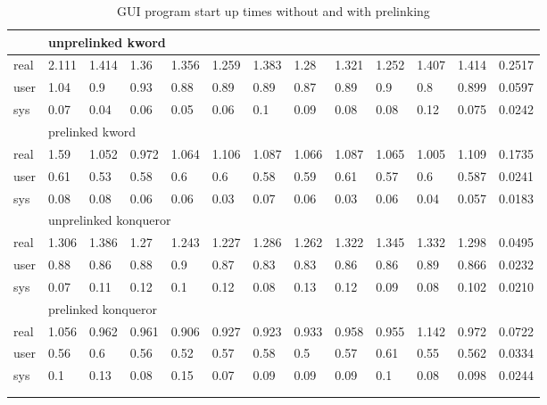 \documentclass[twoside]{article}
\begin{document}
{\begin{center}
\begin{longtable}{l|llllllllll|ll}
\hline
& \multicolumn{10}{l|}{unprelinked kword} && \\
\hline
{real} & {2.111} & {1.414} & {1.36} & {1.356} & {1.259} & {1.383} & {1.28} & {1.321} & {1.252} & {1.407} & {1.414} & {0.2517} \\
{user} & {1.04} & {0.9} & {0.93} & {0.88} & {0.89} & {0.89} & {0.87} & {0.89} & {0.9} & {0.8} & {0.899} & {0.0597} \\
{sys} & {0.07} & {0.04} & {0.06} & {0.05} & {0.06} & {0.1} & {0.09} & {0.08} & {0.08} & {0.12} & {0.075} & {0.0242} \\
\hline
& \multicolumn{10}{l|}{prelinked kword} && \\
\hline
{real} & {1.59} & {1.052} & {0.972} & {1.064} & {1.106} & {1.087} & {1.066} & {1.087} & {1.065} & {1.005} & {1.109} & {0.1735} \\
{user} & {0.61} & {0.53} & {0.58} & {0.6} & {0.6} & {0.58} & {0.59} & {0.61} & {0.57} & {0.6} & {0.587} & {0.0241} \\
{sys} & {0.08} & {0.08} & {0.06} & {0.06} & {0.03} & {0.07} & {0.06} & {0.03} & {0.06} & {0.04} & {0.057} & {0.0183} \\
\hline
& \multicolumn{10}{l|}{unprelinked konqueror} && \\
\hline
{real} & {1.306} & {1.386} & {1.27} & {1.243} & {1.227} & {1.286} & {1.262} & {1.322} & {1.345} & {1.332} & {1.298} & {0.0495} \\
{user} & {0.88} & {0.86} & {0.88} & {0.9} & {0.87} & {0.83} & {0.83} & {0.86} & {0.86} & {0.89} & {0.866} & {0.0232} \\
{sys} & {0.07} & {0.11} & {0.12} & {0.1} & {0.12} & {0.08} & {0.13} & {0.12} & {0.09} & {0.08} & {0.102} & {0.0210} \\
\hline
& \multicolumn{10}{l|}{prelinked konqueror} && \\
\hline
{real} & {1.056} & {0.962} & {0.961} & {0.906} & {0.927} & {0.923} & {0.933} & {0.958} & {0.955} & {1.142} & {0.972} & {0.0722} \\
{user} & {0.56} & {0.6} & {0.56} & {0.52} & {0.57} & {0.58} & {0.5} & {0.57} & {0.61} & {0.55} & {0.562} & {0.0334} \\
{sys} & {0.1} & {0.13} & {0.08} & {0.15} & {0.07} & {0.09} & {0.09} & {0.09} & {0.1} & {0.08} & {0.098} & {0.0244} \\
\hline
\multicolumn{13}{l}{} \\
\caption{GUI program start up times without and with prelinking} \\
\end{longtable}
\end{center}}
\end{document}
